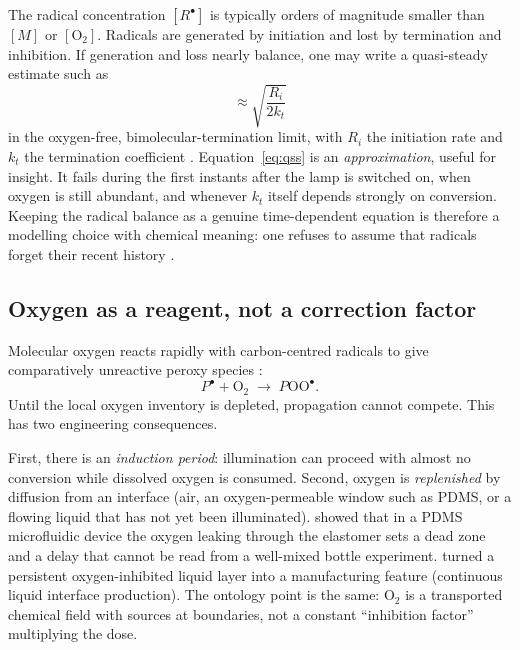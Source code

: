 The radical concentration $[R^\bullet]$ is typically orders of magnitude smaller than $[M]$ or $[\mathrm{O}_2]$.
Radicals are generated by initiation and lost by termination and inhibition.
If generation and loss nearly balance, one may write a quasi-steady estimate such as
\begin{equation}
  [R^\bullet] \approx \sqrt{\frac{R_i}{2k_t}}
  \label{eq:qss}
\end{equation}
in the oxygen-free, bimolecular-termination limit, with $R_i$ the initiation rate and $k_t$ the termination coefficient \citep{Zhu2020}.
Equation~\eqref{eq:qss} is an \emph{approximation}, useful for insight.
It fails during the first instants after the lamp is switched on, when oxygen is still abundant, and whenever $k_t$ itself depends strongly on conversion.
Keeping the radical balance as a genuine time-dependent equation is therefore a modelling choice with chemical meaning: one refuses to assume that radicals forget their recent history \citep{Montgomery2022,Dobson2024,Slutzky2019}.

\subsection{Oxygen as a reagent, not a correction factor}

Molecular oxygen reacts rapidly with carbon-centred radicals to give comparatively unreactive peroxy species \citep{Decker1985,Dendukuri2008,Slutzky2019,Montgomery2022}:
\begin{equation}
  P^\bullet + \mathrm{O}_2 \;\longrightarrow\; P\mathrm{OO}^\bullet.
  \label{eq:oxygen}
\end{equation}
Until the local oxygen inventory is depleted, propagation cannot compete.
This has two engineering consequences.

First, there is an \emph{induction period}: illumination can proceed with almost no conversion while dissolved oxygen is consumed.
Second, oxygen is \emph{replenished} by diffusion from an interface (air, an oxygen-permeable window such as PDMS, or a flowing liquid that has not yet been illuminated).
\citet{Dendukuri2008} showed that in a PDMS microfluidic device the oxygen leaking through the elastomer sets a dead zone and a delay that cannot be read from a well-mixed bottle experiment.
\citet{Tumbleston2015} turned a persistent oxygen-inhibited liquid layer into a manufacturing feature (continuous liquid interface production).
The ontology point is the same: $\mathrm{O}_2$ is a transported chemical field with sources at boundaries, not a constant ``inhibition factor'' multiplying the dose.

